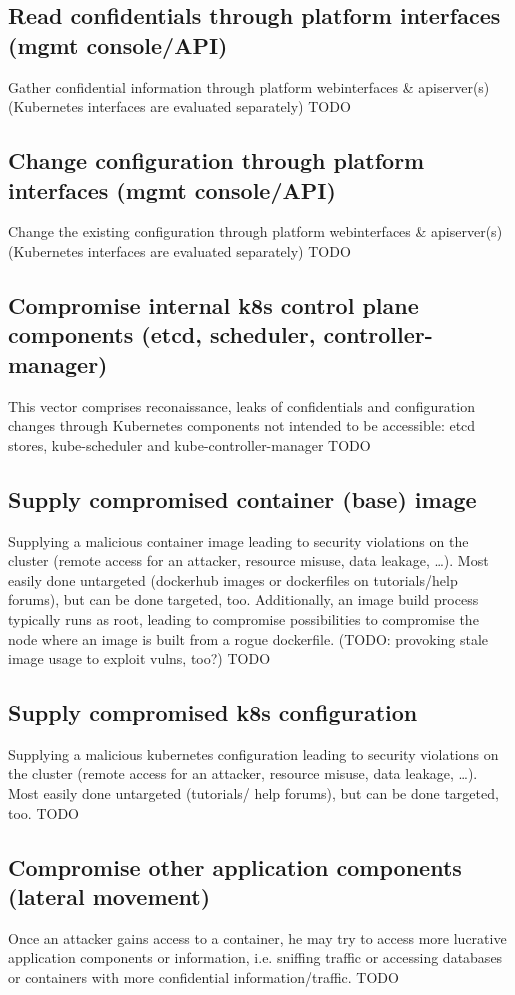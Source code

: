 \subsection{Read confidentials through platform interfaces (mgmt console/API)}
Gather confidential information through platform webinterfaces & apiserver(s) (Kubernetes interfaces are evaluated separately)
TODO

\subsection{Change configuration through platform interfaces (mgmt console/API)}
Change the existing configuration through platform webinterfaces & apiserver(s) (Kubernetes interfaces are evaluated separately)
TODO

\subsection{Compromise internal k8s control plane components (etcd, scheduler, controller-manager)}
This vector comprises reconaissance, leaks of confidentials and configuration changes through Kubernetes components not intended to be accessible: etcd stores, kube-scheduler and kube-controller-manager
TODO

\subsection{Supply compromised container (base) image}
Supplying a malicious container image leading to security violations on the cluster (remote access for an attacker, resource misuse, data leakage, …). Most easily done untargeted (dockerhub images or dockerfiles on tutorials/help forums), but can be done targeted, too. Additionally, an image build process typically runs as root, leading to compromise possibilities to compromise the node where an image is built from a rogue dockerfile. (TODO: provoking stale image usage to exploit vulns, too?)
TODO

\subsection{Supply compromised k8s configuration}
Supplying a malicious kubernetes configuration leading to security violations on the cluster (remote access for an attacker, resource misuse, data leakage, …). Most easily done untargeted (tutorials/ help forums), but can be done targeted, too.
TODO

\subsection{Compromise other application components (lateral movement)}
Once an attacker gains access to a container, he may try to access more lucrative application components or information, i.e. sniffing traffic or accessing databases or containers with more confidential information/traffic.
TODO

